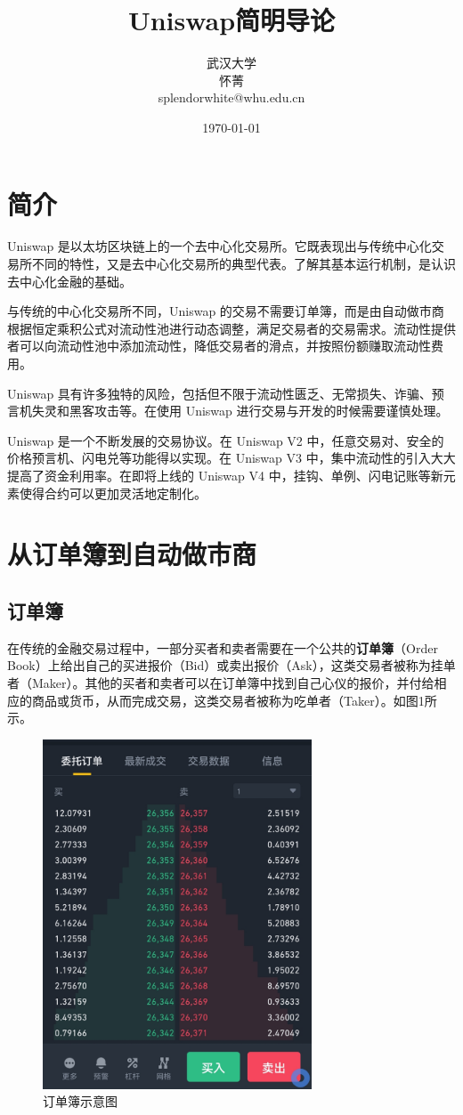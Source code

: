 \documentclass[12pt, a4paper, oneside]{ctexart}
\title{Uniswap简明导论}
\author{武汉大学 \\ 怀菁 \\ splendorwhite@whu.edu.cn}
\date{\today}
\begin{document}
\maketitle

\section{简介}

Uniswap 是以太坊区块链上的一个去中心化交易所。它既表现出与传统中心化交易所不同的特性，又是去中心化交易所的典型代表。了解其基本运行机制，是认识去中心化金融的基础。

与传统的中心化交易所不同，Uniswap 的交易不需要订单簿，而是由自动做市商根据恒定乘积公式对流动性池进行动态调整，满足交易者的交易需求。流动性提供者可以向流动性池中添加流动性，降低交易者的滑点，并按照份额赚取流动性费用。

Uniswap 具有许多独特的风险，包括但不限于流动性匮乏、无常损失、诈骗、预言机失灵和黑客攻击等。在使用 Uniswap 进行交易与开发的时候需要谨慎处理。

Uniswap 是一个不断发展的交易协议。在 Uniswap V2 中，任意交易对、安全的价格预言机、闪电兑等功能得以实现。在 Uniswap V3 中，集中流动性的引入大大提高了资金利用率。在即将上线的 Uniswap V4 中，挂钩、单例、闪电记账等新元素使得合约可以更加灵活地定制化。

\section{从订单簿到自动做市商}

\subsection{订单簿}

在传统的金融交易过程中，一部分买者和卖者需要在一个公共的\textbf{订单簿}（Order Book）上给出自己的买进报价（Bid）或卖出报价（Ask），这类交易者被称为挂单者（Maker）。其他的买者和卖者可以在订单簿中找到自己心仪的报价，并付给相应的商品或货币，从而完成交易，这类交易者被称为吃单者（Taker）。如图1所示。

\begin{figure}[htbp]
    \centering
    \includegraphics[width=8cm]{订单簿示意图.jpg}
    \caption{订单簿示意图}
\end{figure}
\end{document}
